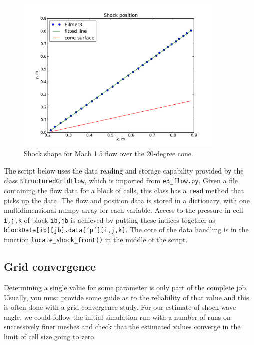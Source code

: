 \begin{figure}[htbp]
\begin{center}
\includegraphics[width=10cm]{../2D/cone20-simple/shock-shape.pdf}
\end{center}
\caption{Shock shape for Mach 1.5 flow over the 20-degree cone.}
\label{cone20-shock-points-fig}
\end{figure}

The script below uses the data reading and storage capability provided by 
the class \texttt{StructuredGridFlow}, which is imported from \texttt{e3\_flow.py}.
Given a file containing the flow data for a block of cells, this class has a \texttt{read} 
method that picks up the data.
The flow and position data is stored in a dictionary, with one multidimensional numpy array 
for each variable.
Access to the pressure in cell \texttt{i,j,k} of block \texttt{ib,jb} is achieved by
putting these indices together as \texttt{blockData[ib][jb].data['p'][i,j,k]}.
The core of the data handling is in the function \texttt{locate\_shock\_front()}
in the middle of the script.

\noindent
\topbar

\bottombar

\subsection{Grid convergence}
%
Determining a single value for some parameter is only part of the complete job.
Usually, you must provide some guide as to the reliability of that value and
this is often done with a grid convergence study.
For our estimate of shock wave angle, we could follow the initial simulation run with a 
number of runs on successively finer meshes and check that the estimated values converge 
in the limit of cell size going to zero.

